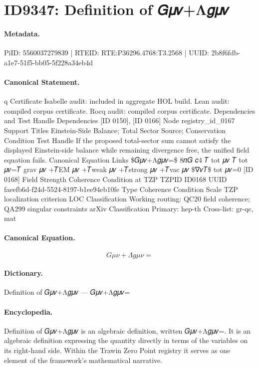 \section*{ID9347: Definition of 𝐺𝜇𝜈+Λ𝑔𝜇𝜈}
\paragraph{Metadata.}
PiID: 5560037279839 | RTEID: RTE:P36296.4768:T3.2568 | UUID: 2b8f6fdb-a1e7-51f5-bb05-5f228a34eb4d

\paragraph{Canonical Statement.}
q Certificate Isabelle audit: included in aggregate HOL build. Lean audit: compiled corpus certificate. Rocq audit: compiled corpus certificate. Dependencies and Test Handle Dependencies [ID 0150], [ID 0166] Node registry\_id\_0167 Support Titles Einstein-Side Balance; Total Sector Source; Conservation Condition Test Handle If the proposed total-sector sum cannot satisfy the displayed Einstein-side balance while remaining divergence free, the unified field equation fails. Canonical Equation Links \$𝐺𝜇𝜈+Λ𝑔𝜇𝜈=\$ 8𝜋𝐺 𝑐4 𝑇 tot 𝜇𝜈 𝑇 tot 𝜇𝜈=𝑇 grav 𝜇𝜈 +𝑇EM 𝜇𝜈 +𝑇weak 𝜇𝜈 +𝑇strong 𝜇𝜈 +𝑇vac 𝜇𝜈 \$∇𝜈𝑇\$ tot 𝜇𝜈=0 [ID 0168] Field Strength Coherence Condition at TZP TZPID ID0168 UUID faeefb6d-f24d-5524-8197-b1ee94eb10fe Type Coherence Condition Scale TZP localization criterion LOC Classification Working routing: QC20 field coherence; QA299 singular constraints arXiv Classification Primary: hep-th Cross-list: gr-qc, mat

\paragraph{Canonical Equation.}
\[
𝐺𝜇𝜈+Λ𝑔𝜇𝜈=
\]

\paragraph{Dictionary.}
Definition of 𝐺𝜇𝜈+Λ𝑔𝜇𝜈 — 𝐺𝜇𝜈+Λ𝑔𝜇𝜈=

\paragraph{Encyclopedia.}
Definition of 𝐺𝜇𝜈+Λ𝑔𝜇𝜈 is an algebraic definition, written 𝐺𝜇𝜈+Λ𝑔𝜇𝜈=. It is an algebraic definition expressing the quantity directly in terms of the variables on its right-hand side. Within the Trawin Zero Point registry it serves as one element of the framework's mathematical narrative.
